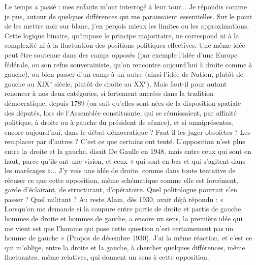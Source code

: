 Le temps a passé : mes enfants m'ont interrogé à leur tour... Je répondis
comme je pus, autour de quelques différences qui me paraissaient essentielles.
Sur le point de les mettre noir sur blanc, j’en perçois mieux les limites ou les
approximations. Cette logique binaire, qu’impose le principe majoritaire, ne
correspond ni à la complexité ni à la fluctuation des positions politiques effectives.
Une même idée peut être soutenue dans des camps opposés (par exemple
l’idée d’une Europe fédérale, ou son refus souverainiste, qu’on rencontre
aujourd’hui à droite comme à gauche), ou bien passer d’un camp à un autre
(ainsi l’idée de Nation, plutôt de gauche au {\footnotesize XIX$^\text{e}$} siècle, plutôt de droite au
{\footnotesize XX$^\text{e}$}). Mais faut-il pour autant renoncer à nos deux catégories, si fortement
ancrées dans la tradition démocratique, depuis 1789 (on sait qu’elles sont nées
de la disposition spatiale des députés, lors de l’Assemblée constituante, qui se
réunissaient, par affinité politique, à droite ou à gauche du président de
séance), et si omniprésentes, encore aujourd’hui, dans le débat démocratique ?
Faut-il les juger obsolètes ? Les remplacer par d’autres ? C’est ce que certains
ont tenté. L'opposition n’est plus entre la droite et la gauche, disait De Gaulle
en 1948, mais entre ceux qui sont en haut, parce qu’ils ont une vision, et ceux
« qui sont en bas et qui s’agitent dans les marécages »... J'y vois une idée de
droite, comme dans toute tentative de récuser ce que cette opposition, même
schématique comme elle est forcément, garde d’éclairant, de structurant,
d’opératoire. Quel politologue pourrait s’en passer ? Quel militant ? Au reste
Alain, dès 1930, avait déjà répondu : « Lorsqu'on me demande si la coupure
entre partis de droite et partis de gauche, hommes de droite et hommes de
gauche, a encore un sens, la première idée qui me vient est que l’homme qui
pose cette question n’est certainement pas un homme de gauche » (Propos de
décembre 1930). J'ai la même réaction, et c’est ce qui m’oblige, entre la droite
et la gauche, à chercher quelques différences, même fluctuantes, même relatives,
qui donnent un sens à cette opposition.

